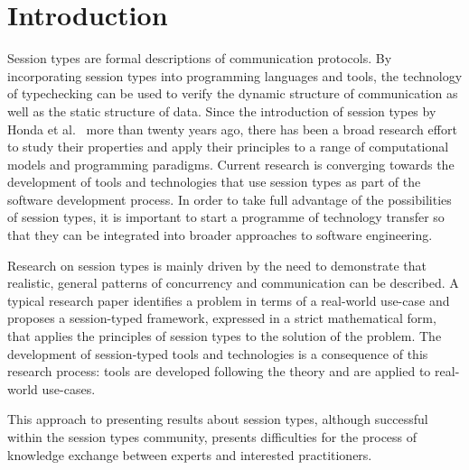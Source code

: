 
\section{Introduction}

Session types are formal descriptions of communication protocols.
By incorporating session types into programming languages and tools,
the technology of typechecking can be used to verify the dynamic
structure of communication as well as the static structure of data.
Since the introduction of session types by Honda et al.\
\cite{honda.vasconcelos.kubo:language-primitives}
more than twenty years ago, there has been a broad research effort to study
their properties and apply their principles to a range of computational models
and programming paradigms.
Current research is converging towards the development of tools and technologies
that use session types as part of the software development process.
In order to take full advantage of the possibilities of session types,
it is important to start a programme of technology transfer so that they can
be integrated into broader approaches to software engineering.

Research on session types is mainly driven by the need to demonstrate that realistic,
general patterns of concurrency and communication can be described.
A typical research paper identifies a problem in terms of a real-world use-case and 
proposes a session-typed framework, expressed in a strict mathematical form, 
that applies the principles of session types to the solution of the problem.
The development of session-typed tools and technologies is a consequence of this
research process: tools are developed following the theory and are applied to real-world use-cases.

This approach to presenting results about session types,
although successful within the session types community,
presents difficulties for the process of knowledge exchange
between experts and interested practitioners.

